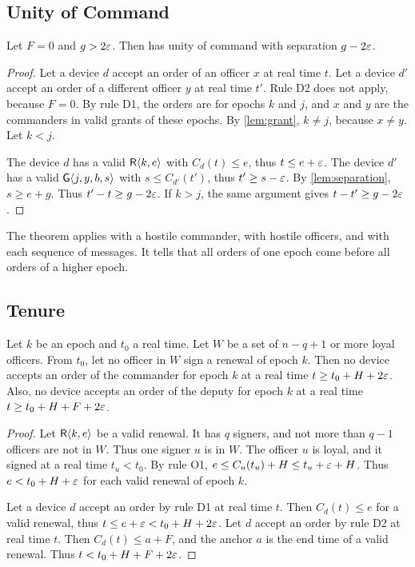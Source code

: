 \subsection{Unity of Command}

\begin{thm}
\label{thm:unity}
Let $F = 0$ and $g > 2\varepsilon$. Then \sys{} has unity of command with separation
$g - 2\varepsilon$.
\end{thm}

\begin{proof}
Let a device $d$ accept an order of an officer $x$ at real time $t$. Let a device $d'$
accept an order of a different officer $y$ at real time $t'$. Rule D2 does not apply,
because $F = 0$. By rule D1, the orders are for epochs $k$ and $j$, and $x$ and $y$ are the
commanders in valid grants of these epochs. By \cref{lem:grant}, $k \ne j$, because
$x \ne y$. Let $k < j$.

The device $d$ has a valid $\mathsf{R}\langle k,e\rangle$ with $C_d(t) \le e$, thus $t \le e + \varepsilon$. The
device $d'$ has a valid $\mathsf{G}\langle j,y,b,s\rangle$ with $s \le C_{d'}(t')$, thus $t' \ge s - \varepsilon$.
By \cref{lem:separation}, $s \ge e + g$. Thus $t' - t \ge g - 2\varepsilon$. If $k > j$, the same
argument gives $t - t' \ge g - 2\varepsilon$.
\end{proof}

The theorem applies with a hostile commander, with hostile officers, and with each sequence
of messages. It tells that all orders of one epoch come before all orders of a higher
epoch.

\subsection{Tenure}

\begin{thm}
\label{thm:tenure}
Let $k$ be an epoch and $t_0$ a real time. Let $W$ be a set of $n - q + 1$ or more loyal
officers. From $t_0$, let no officer in $W$ sign a renewal of epoch $k$. Then no device
accepts an order of the commander for epoch $k$ at a real time $t \ge t_0 + H + 2\varepsilon$.
Also, no device accepts an order of the deputy for epoch $k$ at a real time
$t \ge t_0 + H + F + 2\varepsilon$.
\end{thm}

\begin{proof}
Let $\mathsf{R}\langle k,e\rangle$ be a valid renewal. It has $q$ signers, and not more than $q - 1$
officers are not in $W$. Thus one signer $u$ is in $W$. The officer $u$ is loyal, and it
signed at a real time $t_u < t_0$. By rule O1, $e \le C_u(t_u) + H \le t_u + \varepsilon + H$.
Thus $e < t_0 + H + \varepsilon$ for each valid renewal of epoch $k$.

Let a device $d$ accept an order by rule D1 at real time $t$. Then $C_d(t) \le e$ for a
valid renewal, thus $t \le e + \varepsilon < t_0 + H + 2\varepsilon$. Let $d$ accept an order by rule D2
at real time $t$. Then $C_d(t) \le a + F$, and the anchor $a$ is the end time of a valid
renewal. Thus $t < t_0 + H + F + 2\varepsilon$.
\end{proof}

